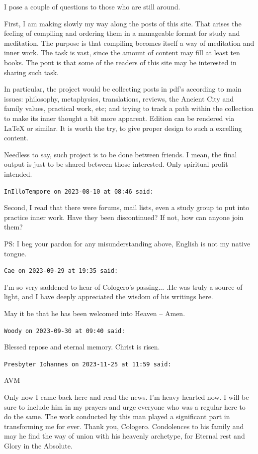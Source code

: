 \begin{footnotesize}
\begin{sffamily}
I pose a couple of questions to those who are still around.

First, I am making slowly my way along the posts of this site. That arises the feeling of compiling and ordering them in a manageable format for study and meditation. The purpose is that compiling becomes itself a way of meditation and inner work. The task is vast, since the amount of content may fill at least ten books. The pont is that some of the readers of this site may be interested in sharing such task.

In particular, the project would be collecting posts in pdf's according to main issues: philosophy, metaphysics, translations, reviews, the Ancient City and family values, practical work, etc; and trying to track a path within the collection to make its inner thought a bit more apparent. Edition can be rendered via LaTeX or similar. It is worth the try, to give proper design to such a excelling content.

Needless to say, such project is to be done between friends. I mean, the final output is just to be shared between those interested. Only spiritual profit intended.

\hfill

\texttt{InIlloTempore on 2023-08-10 at 08:46 said:}

Second, I read that there were forums, mail lists, even a study group to put into practice inner work. Have they been discontinued? If not, how can anyone join them?

PS: I beg your pardon for any misunderstanding above, English is not my native tongue.

\hfill

\texttt{Cae on 2023-09-29 at 19:35 said:}

I'm so very saddened to hear of Cologero's passing... .He was truly a source of light, and I have deeply appreciated the wisdom of his writings here.

May it be that he has been welcomed into Heaven -- Amen.

\hfill

\texttt{Woody on 2023-09-30 at 09:40 said:}

Blessed repose and eternal memory. Christ is risen.

\hfill

\texttt{Presbyter Iohannes on 2023-11-25 at 11:59 said:}

AVM

Only now I came back here and read the news. I'm heavy hearted now. I will be sure to include him in my prayers and urge everyone who was a regular here to do the same. The work conducted by this man played a significant part in transforming me for ever. Thank you, Cologero. Condolences to his family and may he find the way of union with his heavenly archetype, for Eternal rest and Glory in the Absolute.


\end{sffamily}
\end{footnotesize}
